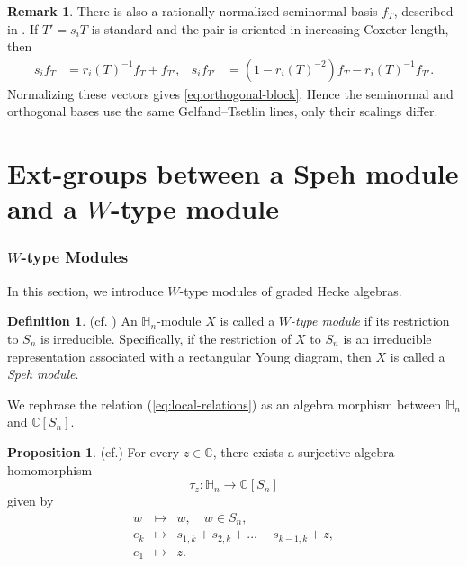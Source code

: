\documentclass[11pt]{amsart}
\numberwithin{equation}{section}
\theoremstyle{definition}
\newtheorem{proposition}[thm]{Proposition}
\newtheorem{remark}[thm]{Remark}
\newtheorem{definition}[thm]{Definition}
\begin{document}
\begin{remark}
There is also a rationally normalized seminormal basis $f_{T}$, described in \cite[Page 23]{vershik2005new}. If
$T'=s_{i}T$ is standard and the pair is oriented in increasing Coxeter
length, then
\begin{align}
  s_{i}f_{T}&=r_{i}(T)^{-1}f_{T}+f_{T'},
  &s_{i}f_{T'}&=(1-r_{i}(T)^{-2})f_{T}-r_{i}(T)^{-1}f_{T'}.
  \label{eq:seminormal-action}
\end{align}
Normalizing these vectors gives \eqref{eq:orthogonal-block}.  Hence the
seminormal and orthogonal bases use the same Gelfand--Tsetlin lines, only
their scalings differ.
\end{remark}



\part{Ext-groups between a Speh module and a \(W\)-type module}
\section{$W$-type Modules}\label{Sec:W-type}

In this section, we introduce $W$-type modules of graded Hecke algebras.


\begin{definition}(cf.  \cite{babasical1999Ktype})
    An $\mathbb{H}_{n}$-module $X$ is called a \emph{$W$-type module} if its restriction to $S_n$ is irreducible. Specifically, if the restriction of $X$ to $S_{n}$ is an irreducible representation associated with a rectangular Young diagram, then $X$ is called a {\it Speh module}.
\end{definition}


We rephrase the relation (\ref{eq:local-relations}) as an algebra morphism between \(\mathbb H_n\) and \(\mathbb C[S_n]\).

\begin{proposition}  \label{prop w module jucys murphy element}  (cf.\cite[Lemma 3.2.1]{barbasch2014unitary}\cite[Section 7.1]{chan2019bernstein})
    For every \( z \in \mathbb{C} \), there exists a surjective algebra homomorphism
\[
\tau_z : \mathbb{H}_{n} \to \mathbb{C}[S_n]
\]
given by
\begin{eqnarray*}
    w &\mapsto& w, \quad w \in S_n,\\
    e_k &\mapsto& s_{1,k}+s_{2,k}+...+s_{k-1,k}+z,\\
    e_1 &\mapsto& z.
\end{eqnarray*}
\end{proposition}
\end{document}
